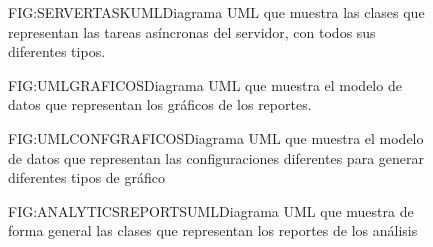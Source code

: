 \begin{figure}[Diagrama UML Tareas Asíncronas]{FIG:SERVERTASKUML}{Diagrama UML que muestra las clases que representan las tareas asíncronas del servidor, con todos sus diferentes tipos.}
\end{figure}

\begin{figure}[Diagrama UML Reportes gráficos]{FIG:UMLGRAFICOS}{Diagrama UML que muestra el modelo de datos que representan los gráficos de los reportes.}
\end{figure}

\begin{figure}[Diagrama UML Preferencias Gráficos]{FIG:UMLCONFGRAFICOS}{Diagrama UML que muestra el modelo de datos que representan las configuraciones diferentes para generar diferentes tipos de gráfico}
\end{figure}
\begin{figure}[Diagrama UML Reportes Análisis]{FIG:ANALYTICSREPORTSUML}{Diagrama UML que muestra de forma general las clases que representan los reportes de los análisis}
\end{figure}